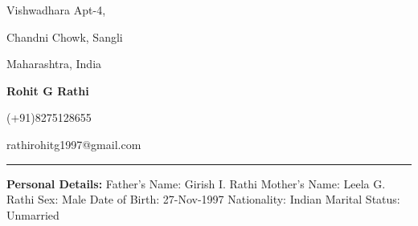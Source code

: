 \documentclass[11pt]{article}
\begin{document}
	\begin{center}
		\begin{minipage}[b]{0.33333\textwidth}
			\raggedright
			Vishwadhara Apt-4,\par
			Chandni Chowk, Sangli\par
			Maharashtra, India
		\end{minipage}%
		\begin{minipage}[b]{0.33333\textwidth}
			\centering
			\begin{huge}
				\textbf{Rohit G Rathi}		
			\end{huge}
		\end{minipage}%
		\begin{minipage}[b]{0.33333\textwidth}
			\raggedleft
			(+91)8275128655\par
			rathirohitg1997@gmail.com
		\end{minipage}%
		\bigskip
		\hrule
		\bigskip
		\smallskip
		\begin{minipage}[t]{0.3\textwidth}
			\raggedright\smallskip
			\begin{LARGE}
				\textbf{Personal Details:}\medskip\linebreak%
				{\small Father's Name: Girish I. Rathi}\linebreak%
				{\small Mother's Name: Leela G. Rathi}\linebreak%
				{\small Sex: Male}\linebreak%
				{\small Date of Birth: 27-Nov-1997}\linebreak%
				{\small Nationality: Indian}\linebreak%
				{\small Marital Status: Unmarried}\linebreak%
			\end{LARGE}
		\end{minipage}%
		\begin{minipage}[t]{0.4\textwidth}
			\centering
			\strut\vspace*{-\baselineskip}\newline
			\setlength{\fboxsep}{4pt}%
			\setlength{\fboxrule}{1pt}%
		\end{minipage}%

\end{center}
\end{document}
